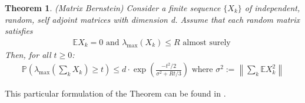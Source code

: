 \documentclass[english]{article}
\newtheorem{theorem}{Theorem}
\newcommand{\1}{\textbf{1}}
\newcommand{\E}{\mathbb{E}}
\newcommand{\p}{\mathbb{P}}
\begin{document}
\begin{theorem} \label{theorem:MatrixBernstein}
(Matrix Bernstein) Consider a finite sequence $\{X_k\}$ of independent, random, self adjoint matrices with dimension d. Assume that each random matrix satisfies
\begin{align}
\E X_k=0 \text{ and } \lambda_{\max}(X_k) \leq R \text{ almost surely }
\end{align}
Then, for all $t \geq 0$:
\begin{align}
\p \left( \lambda_{\max}\left(\sum_{k} X_k \right) \geq t \right) \leq d \cdot \exp\left( \frac{-t^2/2}{\sigma^2+Rt/3}\right) \text{ where } \sigma^2:=\left\| \sum_{k} \E X_k^2 \right\|
\end{align}
\end{theorem}

This particular formulation of the Theorem can be found in \cite{Tropp:TailBoundsRM}.\\
\end{document}
